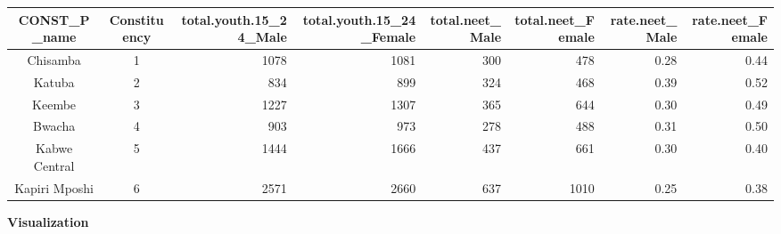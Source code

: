\documentclass[
]{article}
\begin{document}
\begin{table}[!t]
\fontsize{12.0pt}{14.4pt}\selectfont
\begin{tabular*}{\linewidth}{@{\extracolsep{\fill}}ccrrrrrr}
\toprule
CONST\_P\_name & Constituency & total.youth.15\_24\_Male & total.youth.15\_24\_Female & total.neet\_Male & total.neet\_Female & rate.neet\_Male & rate.neet\_Female \\ 
\midrule\addlinespace[2.5pt]
Chisamba & 1 & 1078 & 1081 & 300 & 478 & 0.28 & 0.44 \\ 
Katuba & 2 & 834 & 899 & 324 & 468 & 0.39 & 0.52 \\ 
Keembe & 3 & 1227 & 1307 & 365 & 644 & 0.30 & 0.49 \\ 
Bwacha & 4 & 903 & 973 & 278 & 488 & 0.31 & 0.50 \\ 
Kabwe Central & 5 & 1444 & 1666 & 437 & 661 & 0.30 & 0.40 \\ 
Kapiri Mposhi & 6 & 2571 & 2660 & 637 & 1010 & 0.25 & 0.38 \\ 
\bottomrule
\end{tabular*}
\end{table}

\textbf{Visualization}
\end{document}

